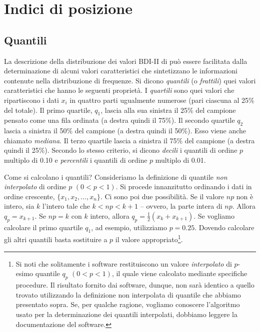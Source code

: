 \section{Indici di posizione}

\subsection{Quantili}

La descrizione della distribuzione dei valori BDI-II di \citet{zetsche_future_2019} può essere facilitata dalla determinazione di alcuni valori caratteristici che sintetizzano le informazioni contenute nella distribuzione di frequenze. 
Si dicono \emph{quantili} (o \emph{frattili}) quei valori caratteristici che hanno le seguenti proprietà. 
I \emph{quartili} sono quei valori che ripartiscono i dati $x_i$ in quattro parti ugualmente numerose (pari ciascuna al 25\% del totale).
Il primo quartile, $q_1$, lascia alla sua sinistra il 25\% del campione pensato come una fila ordinata (a destra quindi il 75\%). 
Il secondo quartile $q_2$ lascia a sinistra il 50\% del campione (a destra quindi il 50\%).
Esso viene anche chiamato \emph{mediana}.
Il terzo quartile lascia a sinistra il 75\% del campione (a destra quindi il 25\%).
Secondo lo stesso criterio, si dicono \emph{decili} i quantili di ordine $p$ multiplo di 0.10 e \emph{percentili} i quantili di ordine $p$ multiplo di 0.01. 

Come si calcolano i quantili? 
Consideriamo la definizione di quantile \emph{non interpolato} di ordine $p$ $(0 < p < 1)$.
Si procede innanzitutto ordinando i dati in ordine crescente, $\{x_1, x_2, \dots, x_n\}$.
Ci sono poi due possibilità.
Se il valore $np$ non è intero, sia $k$ l'intero tale che $k < np < k + 1$ -- ovvero, la parte intera di $np$. 
Allora 
$
q_p = x_{k+1}.
$
Se $np = k$ con $k$ intero, allora
$
q_p = \frac{1}{2}(x_{k} + x_{k+1}).
$
Se vogliamo calcolare il primo quartile $q_1$, ad esempio, utilizziamo $p = 0.25$. 
Dovendo calcolare gli altri quantili basta sostituire a $p$ il valore appropriato\footnote{
Si noti che solitamente i software restituiscono un valore \emph{interpolato} di $p$-esimo quantile $q_p$ $(0 < p < 1)$, il quale viene calcolato mediante specifiche procedure.
Il risultato fornito dai software, dunque, non sarà identico a quello trovato utilizzando la definizione non interpolata di quantile che abbiamo presentato sopra.
Se, per qualche ragione, vogliamo conoscere l'algoritmo usato per la determinazione dei quantili interpolati, dobbiamo leggere la documentazione del software.
}.

